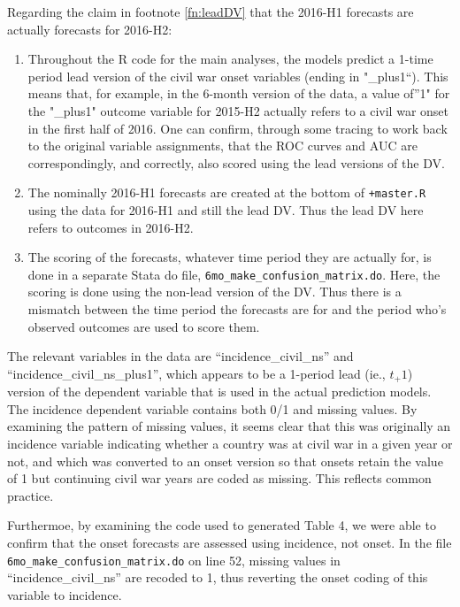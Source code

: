 \documentclass[
]{article}
\providecommand{\tightlist}{%
  \setlength{\itemsep}{0pt}\setlength{\parskip}{0pt}}
\begin{document}
Regarding the claim in footnote \ref{fn:leadDV} that the 2016-H1 forecasts are actually forecasts for 2016-H2:

\begin{enumerate}
\def\labelenumi{\arabic{enumi}.}
\tightlist
\item
  Throughout the R code for the main analyses, the models predict a 1-time period lead version of the civil war onset variables (ending in "\_plus1``). This means that, for example, in the 6-month version of the data, a value of''1" for the "\_plus1" outcome variable for 2015-H2 actually refers to a civil war onset in the first half of 2016. One can confirm, through some tracing to work back to the original variable assignments, that the ROC curves and AUC are correspondingly, and correctly, also scored using the lead versions of the DV.
\item
  The nominally 2016-H1 forecasts are created at the bottom of \texttt{+master.R} using the data for 2016-H1 and still the lead DV. Thus the lead DV here refers to outcomes in 2016-H2.
\item
  The scoring of the forecasts, whatever time period they are actually for, is done in a separate Stata do file, \texttt{6mo\_make\_confusion\_matrix.do}. Here, the scoring is done using the non-lead version of the DV. Thus there is a mismatch between the time period the forecasts are for and the period who's observed outcomes are used to score them.
\end{enumerate}

The relevant variables in the data are ``incidence\_civil\_ns'' and ``incidence\_civil\_ns\_plus1'', which appears to be a 1-period lead (ie., \(t_+1\)) version of the dependent variable that is used in the actual prediction models. The incidence dependent variable contains both 0/1 and missing values. By examining the pattern of missing values, it seems clear that this was originally an incidence variable indicating whether a country was at civil war in a given year or not, and which was converted to an onset version so that onsets retain the value of 1 but continuing civil war years are coded as missing. This reflects common practice.

Furthermoe, by examining the code used to generated Table 4, we were able to confirm that the onset forecasts are assessed using incidence, not onset. In the file \texttt{6mo\_make\_confusion\_matrix.do} on line 52, missing values in ``incidence\_civil\_ns'' are recoded to 1, thus reverting the onset coding of this variable to incidence.
\end{document}
